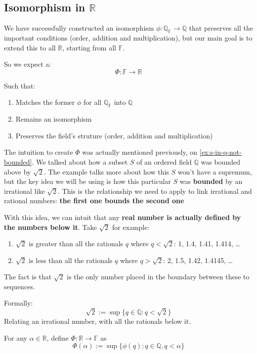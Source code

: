 \subsection{Isomorphism in $\mathbb{R}$}
We have successfully constructed an isomorphism $\phi: \mathbb{Q_F} \rightarrow \mathbb{Q}$ that preserves all the important conditions (order, addition and multiplication), but our main goal is to extend this to all $\mathbb{R}$, starting from all $\mathbb{F}$.

So we expect a:
$$\Phi: \mathbb{F} \rightarrow \mathbb{R}$$

Such that:

\begin{enumerate}
\item Matches the former $\phi$ for all $\mathbb{Q_F}$ into $\mathbb{Q}$
\item Remains an isomorphism
\item Preserves the field's struture (order, addition and multiplication)
\end{enumerate}

The intuition to create $\Phi$ was actually mentioned previously, on \cref{ex:s-in-q-not-bounded}. We talked about how a subset $S$ of an ordered field $\mathbb{Q}$ was bounded above by $\sqrt{2}$. The example talks more about how this $S$ won't have a supremum, but the key idea we will be using is how this particular $S$ was \textbf{bounded} by an irrational like $\sqrt{2}$. This is the relationship we need to apply to link irrational and rational numbers: \textbf{the first one bounds the second one}

With this idea, we can intuit that any \textbf{real number is actually defined by the numbers below it}. Take $\sqrt{2}$ for example:

\begin{enumerate}
\item $\sqrt{2}$ is greater than all the rationals $q$ where $q < \sqrt{2}$: 1, 1.4, 1.41, 1.414, \dots
\item $\sqrt{2}$ is less than all the rationals $q$ where $q > \sqrt{2}$: 2, 1.5, 1.42, 1.4145, \dots
\end{enumerate}

The fact is that $\sqrt{2}$ is the only number placed in the boundary between these to sequences.

Formally:
$$\sqrt{2} := \sup \{q \in \mathbb{Q}: q < \sqrt{2}\}$$
Relating an irrational number, with all the rationals below it.

\begin{definition}\label{def:Phi-function}
For any $\alpha \in \mathbb{R}$, define $\Phi: \mathbb{R} \rightarrow \mathbb{F}$ as
$$\Phi(\alpha) := \sup\{\phi(q): q \in \mathbb{Q}, q < \alpha \}$$
\end{definition}

